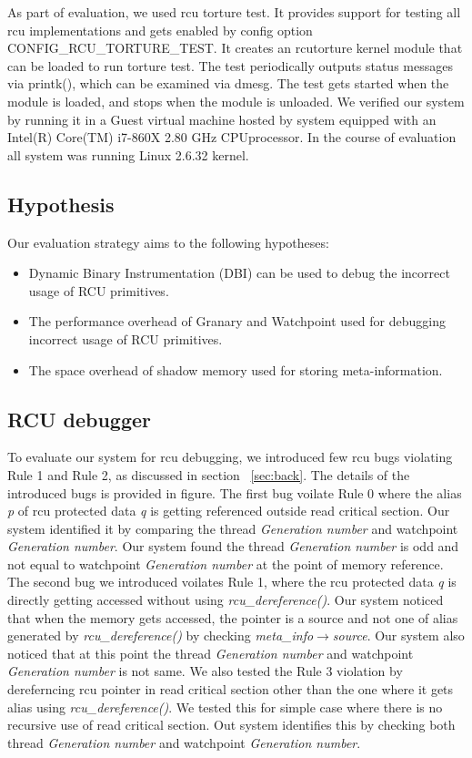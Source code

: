 As part of evaluation, we used rcu torture test. It provides support for testing all rcu implementations and gets enabled by config option CONFIG\_RCU\_TORTURE\_TEST. It creates an rcutorture kernel module that can be loaded to run torture test.  The test periodically outputs status messages via printk(), which can be examined via dmesg. The test gets started when the module is loaded, and stops when the module is unloaded. We veriﬁed our system by running it in a Guest virtual machine hosted by system equipped with an Intel(R) Core(TM) i7-860X 2.80 GHz CPUprocessor. In the course of evaluation all system was running Linux 2.6.32 kernel.

\subsection{Hypothesis}
Our evaluation strategy aims to  the following hypotheses:
\begin{itemize}
	\item Dynamic Binary Instrumentation (DBI) can be used to debug the incorrect usage of RCU primitives.
	\item The performance overhead of Granary and Watchpoint used for debugging incorrect usage of RCU primitives.
	\item The space overhead of shadow memory used for storing meta-information.
\end{itemize}

\subsection {RCU debugger}
To evaluate our system for rcu debugging, we introduced few rcu bugs violating Rule 1 and Rule 2, as discussed in section ~\ref{sec:back}. The details of the introduced bugs is provided in figure. The first bug voilate Rule 0 where the alias \emph{p} of rcu protected data \emph{q} is getting referenced outside read critical section. Our system identified it by comparing the thread \emph{Generation number} and watchpoint \emph{Generation number}. Our system found the thread \emph{Generation number} is odd and not equal to watchpoint \emph{Generation number} at the point of memory reference. The second bug we introduced voilates Rule 1, where the rcu protected data \emph{q} is directly getting accessed without using \emph{rcu\_dereference()}. Our system noticed that when the memory gets accessed, the pointer is a source and not one of  alias generated by \emph{rcu\_dereference()} by checking \emph{meta\_info$\rightarrow$source}. Our system also noticed that at this point the thread \emph{Generation number} and watchpoint \emph{Generation number} is not same. We also tested the Rule 3 violation by dereferncing rcu pointer in read critical section other than the one where it gets alias using \emph{rcu\_dereference()}. We tested this for simple case where there is no recursive use of read critical section. Out system identifies this by checking both thread \emph{Generation number} and watchpoint \emph{Generation number}. 

